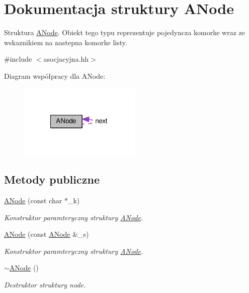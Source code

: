 \hypertarget{struct_a_node}{\section{Dokumentacja struktury A\-Node}
\label{struct_a_node}
}


Struktura \hyperlink{struct_a_node}{A\-Node}. Obiekt tego typu reprezentuje pojedyncza komorke wraz ze wskaznikiem na nastepna komorke listy.  




{\ttfamily \#include $<$asocjacyjna.\-hh$>$}



Diagram współpracy dla A\-Node\-:
\nopagebreak
\begin{figure}[H]
\begin{center}
\leavevmode
\includegraphics[width=165pt]{struct_a_node__coll__graph}
\end{center}
\end{figure}
\subsection*{Metody publiczne}
\begin{DoxyCompactItemize}
\item 
\hyperlink{struct_a_node_ad12f3f4440ad56e7e90d5ac927ba096a}{A\-Node} (const char $\ast$\-\_\-k)
\begin{DoxyCompactList}\small\item\em Konstruktor paramteryczny struktury \hyperlink{struct_a_node}{A\-Node}. \end{DoxyCompactList}\item 
\hyperlink{struct_a_node_a8fd9487184ba1af2150456919869cd60}{A\-Node} (const \hyperlink{struct_a_node}{A\-Node} \&\-\_\-s)
\begin{DoxyCompactList}\small\item\em Konstruktor paramteryczny struktury \hyperlink{struct_a_node}{A\-Node}. \end{DoxyCompactList}\item 
\hyperlink{struct_a_node_aec880ec60e95396aba5ffdc6ce0a4e8d}{$\sim$\-A\-Node} ()
\begin{DoxyCompactList}\small\item\em Destruktor struktury node. \end{DoxyCompactList}\end{DoxyCompactItemize}
